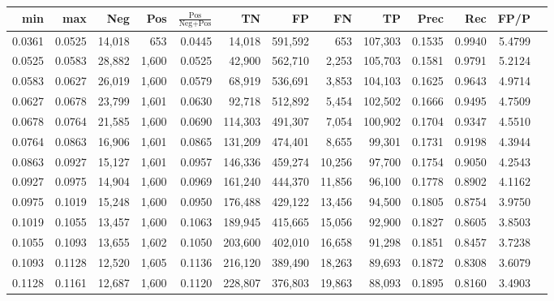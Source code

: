 \begin{tabular}{rrrrrrrrrrrrr}
\toprule
   min &    max &    Neg &   Pos & $\frac{\text{Pos}}{\text{Neg}+\text{Pos}}$ &      TN &      FP &      FN &      TP &   Prec &    Rec &   FP/P \\
\midrule
0.0361 & 0.0525 & 14,018 &   653 &                                     0.0445 &  14,018 & 591,592 &     653 & 107,303 & 0.1535 & 0.9940 & 5.4799 \\
0.0525 & 0.0583 & 28,882 & 1,600 &                                     0.0525 &  42,900 & 562,710 &   2,253 & 105,703 & 0.1581 & 0.9791 & 5.2124 \\
0.0583 & 0.0627 & 26,019 & 1,600 &                                     0.0579 &  68,919 & 536,691 &   3,853 & 104,103 & 0.1625 & 0.9643 & 4.9714 \\
0.0627 & 0.0678 & 23,799 & 1,601 &                                     0.0630 &  92,718 & 512,892 &   5,454 & 102,502 & 0.1666 & 0.9495 & 4.7509 \\
0.0678 & 0.0764 & 21,585 & 1,600 &                                     0.0690 & 114,303 & 491,307 &   7,054 & 100,902 & 0.1704 & 0.9347 & 4.5510 \\
0.0764 & 0.0863 & 16,906 & 1,601 &                                     0.0865 & 131,209 & 474,401 &   8,655 &  99,301 & 0.1731 & 0.9198 & 4.3944 \\
0.0863 & 0.0927 & 15,127 & 1,601 &                                     0.0957 & 146,336 & 459,274 &  10,256 &  97,700 & 0.1754 & 0.9050 & 4.2543 \\
0.0927 & 0.0975 & 14,904 & 1,600 &                                     0.0969 & 161,240 & 444,370 &  11,856 &  96,100 & 0.1778 & 0.8902 & 4.1162 \\
0.0975 & 0.1019 & 15,248 & 1,600 &                                     0.0950 & 176,488 & 429,122 &  13,456 &  94,500 & 0.1805 & 0.8754 & 3.9750 \\
0.1019 & 0.1055 & 13,457 & 1,600 &                                     0.1063 & 189,945 & 415,665 &  15,056 &  92,900 & 0.1827 & 0.8605 & 3.8503 \\
0.1055 & 0.1093 & 13,655 & 1,602 &                                     0.1050 & 203,600 & 402,010 &  16,658 &  91,298 & 0.1851 & 0.8457 & 3.7238 \\
0.1093 & 0.1128 & 12,520 & 1,605 &                                     0.1136 & 216,120 & 389,490 &  18,263 &  89,693 & 0.1872 & 0.8308 & 3.6079 \\
0.1128 & 0.1161 & 12,687 & 1,600 &                                     0.1120 & 228,807 & 376,803 &  19,863 &  88,093 & 0.1895 & 0.8160 & 3.4903 \\

\end{tabular}
